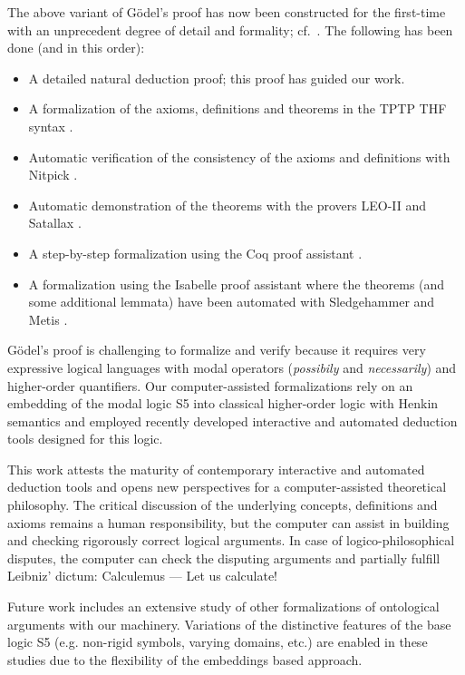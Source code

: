 \documentclass{llncs}
\begin{document}
The above variant of G\"{o}del's proof has now been 
constructed for the first-time
with an unprecedent degree of detail and formality; cf.~\cite{FormalTheologyRepository}. The following has been done (and in this order):
\begin{itemize}
\item A detailed natural deduction proof; this proof has guided our work.
%
\item A formalization of the axioms, definitions and theorems in the TPTP THF syntax \cite{J22}.
%
\item Automatic verification of the consistency of the axioms and 
definitions with Nitpick \cite{Nitpick}.
%
\item Automatic demonstration of the theorems with the provers LEO-II \cite{LEO-II} and Satallax \cite{Satallax}.

\item A step-by-step formalization using the Coq proof assistant \cite{Coq}.

\item A formalization using the Isabelle proof assistant \cite{Isabelle} where the theorems (and some additional lemmata) have been automated with Sledgehammer \cite{Sledgehammer} and Metis \cite{Hurd03first-orderproof}.
\end{itemize}

G\"{o}del's proof is challenging to formalize and verify 
because it requires very expressive logical languages with 
modal operators (\emph{possibily} and \emph{necessarily}) and higher-order quantifiers. 
Our computer-assisted formalizations rely on an embedding of the modal logic S5 
into classical higher-order logic with Henkin 
semantics \cite{J23,B9} and 
employed recently developed interactive and automated deduction tools designed for this logic.

This work attests the maturity of contemporary interactive and
automated deduction tools and opens new perspectives for a
computer-assisted theoretical philosophy.  
The critical discussion of the underlying concepts, definitions and
axioms remains a human responsibility, but the computer can assist in
building and checking rigorously correct logical arguments. In case of
logico-philosophical disputes, the computer can check the disputing
arguments and partially fulfill Leibniz' dictum: Calculemus --- Let us
calculate!

Future work includes an extensive study of other formalizations of
ontological arguments with our machinery. Variations of the
distinctive features of the base logic S5 (e.g. non-rigid symbols, 
varying domains, etc.) are enabled in these studies due
to the flexibility of the embeddings based approach.



\end{document}
